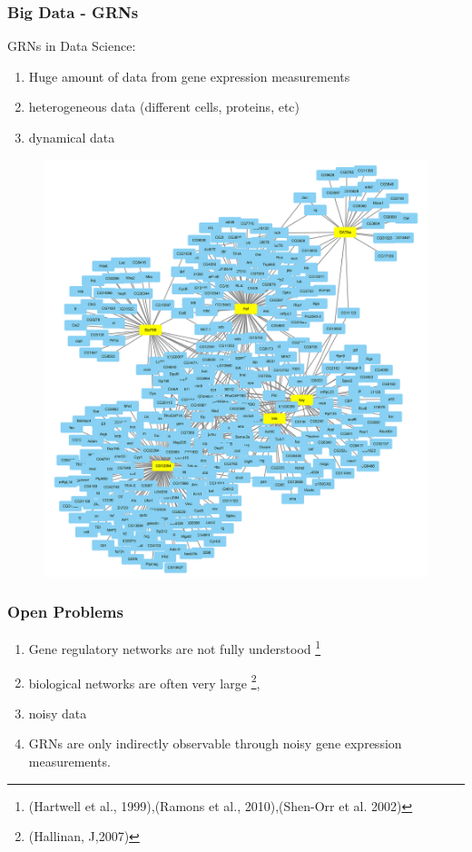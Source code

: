 \documentclass{beamer}
\begin{document}
\begin{frame}
\frametitle{Big Data -  GRNs}
GRNs in Data Science:
\begin{enumerate}
\item Huge amount of data from gene expression measurements
\item heterogeneous data (different cells, proteins, etc)
\item dynamical data
\end{enumerate}

\begin{figure}[h]
\centering
\includegraphics[scale=0.4]{bigdata.jpg}
\end{figure}
\end{frame}

\begin{frame}
\frametitle{Open Problems}
\begin{enumerate}
\item Gene regulatory networks are not fully understood \footnote{(Hartwell et al., 1999),(Ramons et al., 2010),(Shen-Orr et al. 2002)} 
\item biological  networks  are  often very large  \footnote{(Hallinan, J,2007)},
\item noisy data
\item GRNs are only indirectly observable  through  noisy  gene  expression  measurements.
\end{enumerate}
\end{frame}
\end{document}
